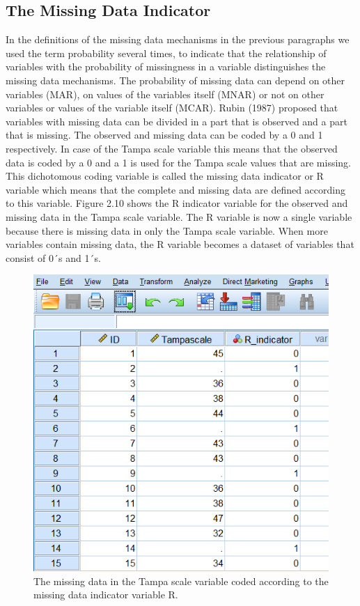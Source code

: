 \documentclass[]{book}
\begin{document}
\subsection{The Missing Data
Indicator}\label{the-missing-data-indicator}

In the definitions of the missing data mechanisms in the previous
paragraphs we used the term probability several times, to indicate that
the relationship of variables with the probability of missingness in a
variable distinguishes the missing data mechanisms. The probability of
missing data can depend on other variables (MAR), on values of the
variables itself (MNAR) or not on other variables or values of the
variable itself (MCAR). Rubin (1987) proposed that variables with
missing data can be divided in a part that is observed and a part that
is missing. The observed and missing data can be coded by a 0 and 1
respectively. In case of the Tampa scale variable this means that the
observed data is coded by a 0 and a 1 is used for the Tampa scale values
that are missing. This dichotomous coding variable is called the missing
data indicator or R variable which means that the complete and missing
data are defined according to this variable. Figure 2.10 shows the R
indicator variable for the observed and missing data in the Tampa scale
variable. The R variable is now a single variable because there is
missing data in only the Tampa scale variable. When more variables
contain missing data, the R variable becomes a dataset of variables that
consist of 0´s and 1´s.

\begin{figure}

{\centering \includegraphics[width=0.9\linewidth]{images/fig2.8} 

}

\caption{The missing data in the Tampa scale variable coded according to the missing data indicator variable R.}\label{fig:fig34}
\end{figure}
\end{document}
